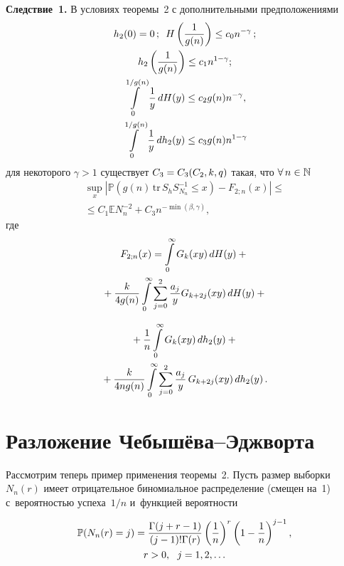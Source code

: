 \begin{multicols}{2}
\noindent
\textbf{Следствие~1.} 
В условиях теоремы~2 с дополнительными предположениями
\begin{gather*}
h_2(0) = 0\,; \enskip  H\left(\displaystyle\frac{\displaystyle 1\mathstrut}{\displaystyle g(n)\mathstrut}\right)\leq c_0 n^{-\gamma}\,; \\
 h_2\left(\displaystyle\frac{\displaystyle 1\mathstrut}{\displaystyle g(n)\mathstrut}\right)\leq c_1 n^{1-\gamma}; \\
\int\limits^{1/g(n)}_{0}\displaystyle\frac{\displaystyle 1\mathstrut}{\displaystyle y\mathstrut}\,dH(y)\leq c_2 g(n) n^{-\gamma}, \\ 
\int\limits^{1/g(n)}_{0} \displaystyle\frac{\displaystyle 1\mathstrut}{\displaystyle y\mathstrut} \,dh_2(y) \leq c_3 g(n) n^{1-\gamma}
\end{gather*}
для некоторого $\gamma > 1$
существует $C_3\hm=C_3(C_2,k,q)$ такая, что $ \forall\,n \hm\in \mathbb{N}$
\begin{multline*}
\sup\limits_{x} \left| \mathbb{P}\left( g(n) \,\mathrm{tr}\,S_h S^{-1}_{N_n} \leq 
x\right)  - F_{2;n}(x) \right| \leq{}\\
{}\leq C_1\mathbb{E}N_n^{-2} + C_3 n^{-\min(\beta,\gamma)},
\end{multline*}
где
\begin{multline*}
F_{2;n}(x) = \int\limits^{\infty}_{0} G_k(xy)\,dH(y) +{}\\
{}+ \displaystyle\frac{\displaystyle k\mathstrut}{\displaystyle 4g(n)\mathstrut} 
\int\limits_{0}^\infty \sum\limits_{j=0}^{2} \displaystyle\frac{\displaystyle a_j\mathstrut}{\displaystyle y\mathstrut} G_{k+2j}(xy)\,dH(y) +  {} 
\end{multline*}

\noindent
\begin{multline}
\label{gn2n}
{}+  \displaystyle\frac{\displaystyle 1\mathstrut}{\displaystyle n\mathstrut}\int\limits^{\infty}_{0} G_k(xy) \,dh_2(y) + {}\\
{}+
\displaystyle\frac{\displaystyle k\mathstrut}{\displaystyle 4ng(n)\mathstrut} \int\limits_{0}^\infty \sum\limits_{j=0}^{2}\displaystyle\frac{\displaystyle a_j\mathstrut}{\displaystyle y\mathstrut}\,G_{k+2j}(xy)\,dh_2(y)\,.
\end{multline}

\vspace*{-6pt}

\section{Разложение Чебышёва--Эджворта}

Рассмотрим теперь пример применения тео\-ре\-мы~2. Пусть размер выборки~$N_n(r)$ 
имеет отрицательное биномиальное распределение (смещен на~1) 
с~вероятностью успеха~$1/n$ и~функцией вероятности

\vspace*{-6pt}

\noindent
\begin{multline}
\label{eq5}
\mathbb{P}(N_n(r)=j)= \displaystyle\frac{\displaystyle \Gamma(j+r-1)\mathstrut}{\displaystyle (j-1)!\Gamma(r)\mathstrut}\left(\displaystyle\frac{\displaystyle 1\mathstrut}{\displaystyle n\mathstrut} \right)^{r}
\left( 1 - \displaystyle\frac{\displaystyle 1\mathstrut}{\displaystyle n\mathstrut} \right)^{j-1}, \\
 r>0, \ \ j =1, 2, 
\ldots
\end{multline}


\end{multicols}
